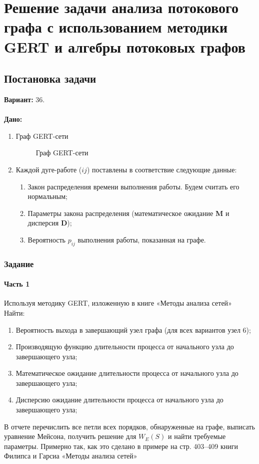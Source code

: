\chapter{Решение задачи анализа потокового графа с использованием методики GERT и алгебры потоковых графов}
\section{Постановка задачи}
\textbf{Вариант:} 36.\\\\
\textbf{Дано:}
\begin{enumerate}
\item Граф GERT-сети
\begin{figure}[H]
  \centering
  \caption{Граф GERT-сети}
\end{figure}
\item Каждой дуге-работе ($ij$) поставлены в соответствие следующие данные:
\begin{enumerate}
\item Закон распределения времени выполнения работы. Будем считать его нормальным;
\item Параметры закона распределения (математическое ожидание \textbf{M} и дисперсия \textbf{D});
\item Вероятность $p_{ij}$ выполнения работы, показанная на графе.
\end{enumerate}
\end{enumerate}


\subsection{Задание}
\subsubsection{Часть 1}
Используя методику GERT, изложенную в книге «Методы анализа сетей»\\
Найти:
\begin{enumerate}
\item Вероятность выхода в завершающий узел графа (для всех вариантов узел 6);
\item Производящую функцию длительности процесса от начального узла  до завершающего узла;
\item Математическое ожидание длительности процесса от начального узла  до завершающего узла;
\item Дисперсию ожидание длительности процесса от начального узла  до завершающего узла;
\end{enumerate}
В отчете перечислить все петли всех порядков, обнаруженные на графе, выписать уравнение Мейсона, получить решение для $W_E(S)$ и найти требуемые параметры. Примерно так, как это сделано в примере на стр. 403–409 книги Филипса и Гарсиа «Методы анализа сетей»
